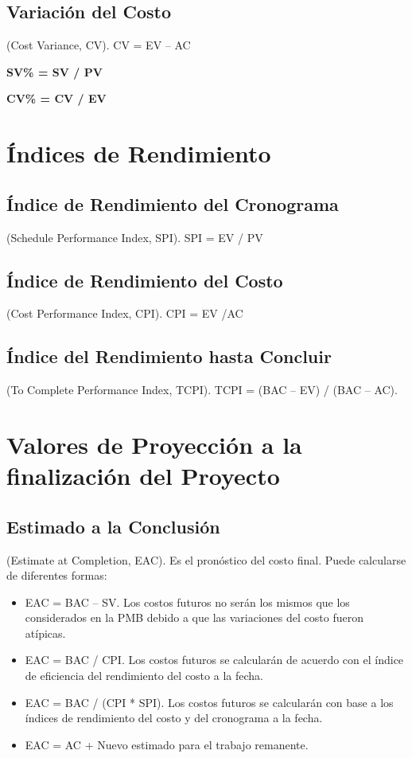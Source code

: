 \documentclass{article}
\newcommand*\rbreak{\par\noindent\linebreak}
\begin{document}
                \subsection{Variación del Costo}
                (Cost Variance, CV). CV = EV – AC\rbreak
                \bfseries{SV\%} = SV / PV \rbreak
                \bfseries{CV\%} = CV / EV
                \section{Índices de Rendimiento}
    \subsection{Índice de Rendimiento del Cronograma} (Schedule Performance Index, SPI). SPI = EV / PV
    \subsection{Índice de Rendimiento del Costo} (Cost Performance Index, CPI). CPI = EV /AC
    \subsection{Índice del Rendimiento hasta Concluir} (To Complete Performance Index, TCPI). TCPI = (BAC – EV) / (BAC – AC).
\section{Valores de Proyección a la finalización del Proyecto}
    \subsection{Estimado a la Conclusión} (Estimate at Completion, EAC). Es el pronóstico del costo final. Puede calcularse de diferentes formas:
    \begin{itemize}
        \item EAC = BAC – SV. Los costos futuros no serán los mismos que los considerados en la PMB debido a que las variaciones del costo fueron atípicas.
        \item EAC = BAC / CPI. Los costos futuros se calcularán de acuerdo con el índice de eficiencia del rendimiento del costo a la fecha.
        \item EAC = BAC / (CPI * SPI). Los costos futuros se calcularán con base a los índices de rendimiento del costo y del cronograma a la fecha.
        \item EAC = AC + Nuevo estimado para el trabajo remanente.
    \end{itemize}
\end{document}
